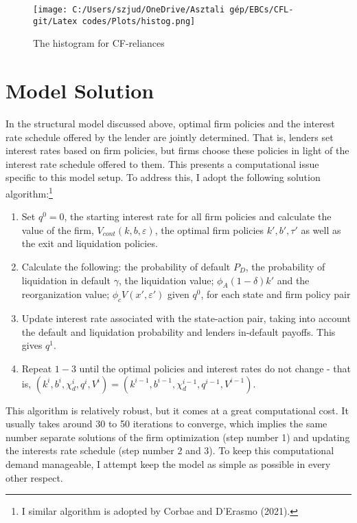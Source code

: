 \documentclass[12pt]{article}
\begin{document}
\begin{figure}[H]  %
    \centering
    \texttt{[image: C:/Users/szjud/OneDrive/Asztali gép/EBCs/CFL-git/Latex codes/Plots/histog.png]}
    \caption{The histogram for CF-reliances} \label{chart:histog}
\end{figure}


\newpage

\appendix
\section{Model Solution \label{sec: qualitative analysis}}

In the structural model discussed above, optimal firm policies and the interest rate schedule offered by the lender are jointly determined. That is, lenders set interest rates based on firm policies, but firms choose these policies in light of the interest rate schedule offered to them. This presents a computational issue specific to this model setup. To address this, I adopt the following solution algorithm:\footnote{I similar algorithm is adopted by Corbae and D'Erasmo (2021).}
\begin{enumerate}
    \item Set $q^0 = 0$, the starting interest rate for all firm policies and calculate the value of the firm, $V_{cont}(k,b,\varepsilon)$, the optimal firm policies $k', b', \tau'$ as well as the exit and liquidation policies. 
    \item Calculate the following: the probability of default $P_D$, the probability of liquidation in default $\gamma$, the liquidation value; $\phi_A (1-\delta) k'$ and the reorganization value; $\phi_c V (x', \varepsilon')$ given $q^0$, for each state and firm policy pair
    \item Update interest rate associated with the state-action pair, taking into account the default and liquidation probability and lenders in-default payoffs. This gives  $q^1$. 
    \item Repeat $1-3$ until the optimal policies and interest rates do not change - that is, $ (k^{i},b^{i},\chi_d^{i},q^{i}, V^{i}) = (k^{i-1},b^{i-1},\chi_d^{i-1}, q^{i-1}, V^{i-1}) $.
\end{enumerate}
This algorithm is relatively robust, but it comes at a great computational cost. It usually takes around 30 to 50 iterations to converge, which implies the same number separate solutions of the firm optimization (step number 1) and updating the interests rate schedule (step number 2 and 3). To keep this computational demand manageable, I attempt keep the model as simple as possible in every other respect.
\end{document}
